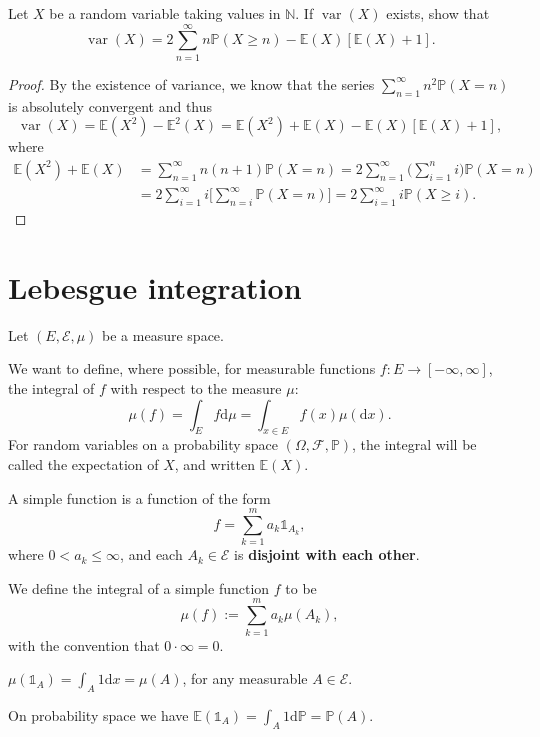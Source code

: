 \documentclass[11pt,singlecolumn, openany, citestyle=authoryear]{elegantbook}
\begin{document}
\begin{CJK}{UTF8}{gbsn}
\begin{exercise}
    Let $X$ be a random variable taking values in $\mathbb{N}$. If 
    $\operatorname{var}(X)$ exists, show that 
    $$
    \operatorname{var}(X)=2\sum_{n=1}^\infty n\mathbb{P}(X\geqslant n)-\mathbb{E}(X)
    [\mathbb{E}(X)+1].
    $$
\end{exercise}
\begin{proof}
    By the existence of variance, we know that the series $\displaystyle \sum_{n=1}^\infty 
    n^2\mathbb{P}(X=n)$ is absolutely convergent and thus 
    $$
    \operatorname{var}(X)=\mathbb{E}(X^2)-\mathbb{E}^2(X)=\mathbb{E}(X^2)+\mathbb{E}(X)-
    \mathbb{E}(X)[\mathbb{E}(X)+1],
    $$
    where 
    \begin{align*}
        \mathbb{E}(X^2)+\mathbb{E}(X) &= \sum_{n=1}^\infty n(n+1)\mathbb{P}(X=n) 
        = 2\sum_{n=1}^\infty \biggl(\sum_{i=1}^n i\biggr)\mathbb{P}(X=n)\\
        &= 2\sum_{i=1}^\infty i\biggl[\sum_{n=i}^\infty \mathbb{P}(X=n)\biggr]
        =2\sum_{i=1}^\infty i \mathbb{P}(X\geqslant i).
    \end{align*}
\end{proof}


\section{Lebesgue integration}
Let $(E, \mathcal{E} , \mu)$ be a measure space.

We want to define, where possible, for measurable functions $f : E \to [-\infty, \infty]$, 
the integral of $f$ with respect to the measure $\mu$:
$$
\mu(f) = \int_E f\mathrm{d}\mu = \int_{x \in E}f(x)\mu(\mathrm{d}x).
$$
For random variables on a probability space $(\Omega, \mathcal{F}, \mathbb{P})$, 
the integral will be called the expectation of $X$, and written $\mathbb{E}(X)$.
\begin{definition}
     A simple function is a function of the form 
    $$
    f = \sum_{k=1}^m a_k \mathds{1}_{A_k},
    $$
    where $0 < a_k \leq \infty$, and each $A_k \in \mathcal{E}$ is \textbf{disjoint with each other}.
\end{definition}
\begin{definition}
    We define the integral of a simple function $f$ to be
    $$
    \mu(f) := \sum_{k=1}^m a_k \mu(A_k),
    $$
    with the convention that $0 \cdot \infty = 0$. 
\end{definition}
\begin{example}
    $\mu(\mathds{1}_{A}) =\displaystyle \int_A 1\mathrm{d}x = \mu(A)$, for any measurable $A \in \mathcal{E}$.
\end{example}
\begin{example}
    On probability space we have 
    $\mathbb{E}(\mathds{1}_A)=\displaystyle \int_A 1\mathrm{d}\mathbb{P} = 
    \mathbb{P}(A)$.
\end{example}


\end{CJK}
\end{document}

